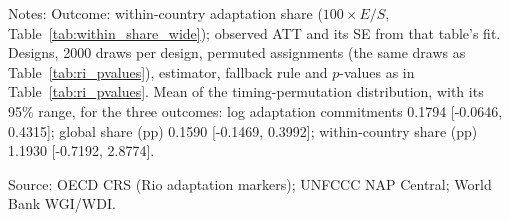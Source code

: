 \begin{table}[H]
\centering
\caption{Randomization inference for the within-country adaptation share}
\label{tab:ri_pvalues_within}
\par\vspace{4pt}
\begin{minipage}{\linewidth}\footnotesize
Notes: Outcome: within-country adaptation share ($100 \times E/S$, Table~\ref{tab:within_share_wide}); observed ATT and its SE from that table's fit. Designs, 2000 draws per design, permuted assignments (the same draws as Table~\ref{tab:ri_pvalues}), estimator, fallback rule and $p$-values as in Table~\ref{tab:ri_pvalues}. Mean of the timing-permutation distribution, with its 95\% range, for the three outcomes: log adaptation commitments 0.1794 [-0.0646, 0.4315]; global share (pp) 0.1590 [-0.1469, 0.3992]; within-country share (pp) 1.1930 [-0.7192, 2.8774].\par
Source: OECD CRS (Rio adaptation markers); UNFCCC NAP Central; World Bank WGI/WDI.
\end{minipage}
\end{table}
